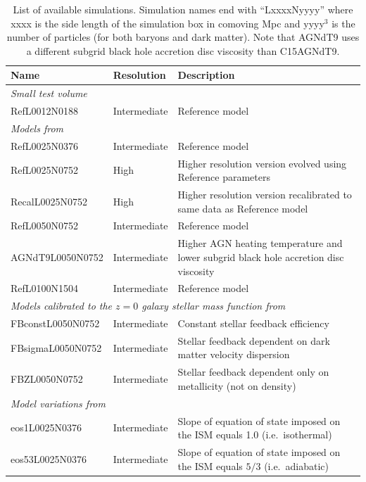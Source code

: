 \documentclass[10pt, a4paper]{article}
\begin{document}
\begin{table}
\caption{List of available simulations. Simulation names end with
``LxxxxNyyyy'' where xxxx is the side length of the simulation box in comoving
Mpc and yyyy$^3$ is the number of particles (for both baryons and dark matter).
Note that AGNdT9 uses a different subgrid black hole accretion disc viscosity
than C15AGNdT9.}
\label{table:runs}  
\begin{center}
\footnotesize
\begin{tabular}{lll}
\hline
Name & Resolution & Description \\ \hline\hline
\multicolumn{3}{l}{\emph{Small test volume}}\\
\hline
{\sc Ref}L0012N0188 & Intermediate & Reference model\\
\hline
\multicolumn{3}{l}{\emph{Models from \cite{schaye2015}}}\\
\hline
{\sc Ref}L0025N0376 & Intermediate & Reference model\\
{\sc Ref}L0025N0752 & High & Higher resolution version evolved using Reference
parameters\\ {\sc Recal}L0025N0752 & High & Higher resolution version recalibrated to
same data as Reference model\\
{\sc Ref}L0050N0752 & Intermediate & Reference model\\
{\sc AGNdT9}L0050N0752 & Intermediate & Higher AGN heating temperature and lower
subgrid black hole accretion disc viscosity\\
{\sc Ref}L0100N1504 & Intermediate &
Reference model\\ \hline \multicolumn{3}{l}{\emph{Models calibrated to the
$z=0$ galaxy stellar mass function from \cite{crain2015}}}\\
\hline
{\sc FBconst}L0050N0752 & Intermediate &Constant stellar feedback efficiency\\
{\sc FBsigma}L0050N0752 & Intermediate &Stellar feedback dependent on dark matter
velocity dispersion\\
{\sc FBZ}L0050N0752 & Intermediate &Stellar feedback dependent
only on metallicity (not on density)\\
\hline
\multicolumn{3}{l}{\emph{Model variations from \cite{crain2015}}}\\
\hline {\sc eos1}L0025N0376 & Intermediate
&Slope of equation of state imposed on the ISM equals 1.0 (i.e.\ isothermal)\\
{\sc eos53}L0025N0376& Intermediate &Slope of equation of state imposed on the ISM
equals $5/3$ (i.e.\ adiabatic)\\

\end{tabular}
\end{center}
\end{table}
\end{document}
